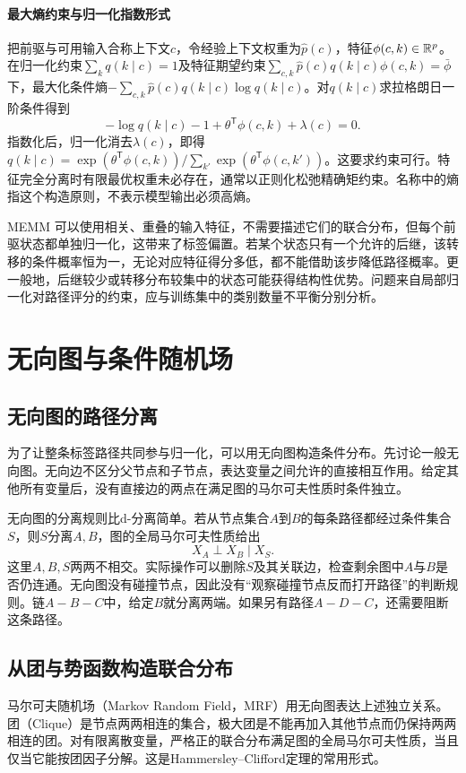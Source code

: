 \paragraph{最大熵约束与归一化指数形式}
把前驱与可用输入合称上下文$c$，令经验上下文权重为$\hat p(c)$，特征$\phi(c,k)\in\mathbb{R}^p$。在归一化约束$\sum_kq(k\mid c)=1$及特征期望约束$\sum_{c,k}\hat p(c)q(k\mid c)\phi(c,k)=\bar\phi$下，最大化条件熵$-\sum_{c,k}\hat p(c)q(k\mid c)\log q(k\mid c)$。对$q(k\mid c)$求拉格朗日一阶条件得到
\begin{equation}
 -\log q(k\mid c)-1+\theta^{\mathsf T}\phi(c,k)+\lambda(c)=0.
\end{equation}
指数化后，归一化消去$\lambda(c)$，即得$q(k\mid c)=\exp(\theta^{\mathsf T}\phi(c,k))/\sum_{k'}\exp(\theta^{\mathsf T}\phi(c,k'))$。这要求约束可行。特征完全分离时有限最优权重未必存在，通常以正则化松弛精确矩约束。名称中的熵指这个构造原则，不表示模型输出必须高熵。

MEMM 可以使用相关、重叠的输入特征，不需要描述它们的联合分布，但每个前驱状态都单独归一化，这带来了标签偏置。若某个状态只有一个允许的后继，该转移的条件概率恒为一，无论对应特征得分多低，都不能借助该步降低路径概率。更一般地，后继较少或转移分布较集中的状态可能获得结构性优势。问题来自局部归一化对路径评分的约束，应与训练集中的类别数量不平衡分别分析。

\section{无向图与条件随机场}
\subsection{无向图的路径分离}
为了让整条标签路径共同参与归一化，可以用无向图构造条件分布。先讨论一般无向图。无向边不区分父节点和子节点，表达变量之间允许的直接相互作用。给定其他所有变量后，没有直接边的两点在满足图的马尔可夫性质时条件独立。

无向图的分离规则比d-分离简单。若从节点集合$A$到$B$的每条路径都经过条件集合$S$，则$S$分离$A,B$，图的全局马尔可夫性质给出
\begin{equation}
 X_A\perp X_B\mid X_S.
 \label{eq:bayes-undirected-separation}
\end{equation}
这里$A,B,S$两两不相交。实际操作可以删除$S$及其关联边，检查剩余图中$A$与$B$是否仍连通。无向图没有碰撞节点，因此没有“观察碰撞节点反而打开路径”的判断规则。链$A-B-C$中，给定$B$就分离两端。如果另有路径$A-D-C$，还需要阻断这条路径。

\subsection{从团与势函数构造联合分布}
马尔可夫随机场（Markov Random Field，MRF）用无向图表达上述独立关系。团（Clique）是节点两两相连的集合，极大团是不能再加入其他节点而仍保持两两相连的团。对有限离散变量，严格正的联合分布满足图的全局马尔可夫性质，当且仅当它能按团因子分解。这是Hammersley--Clifford定理的常用形式。

